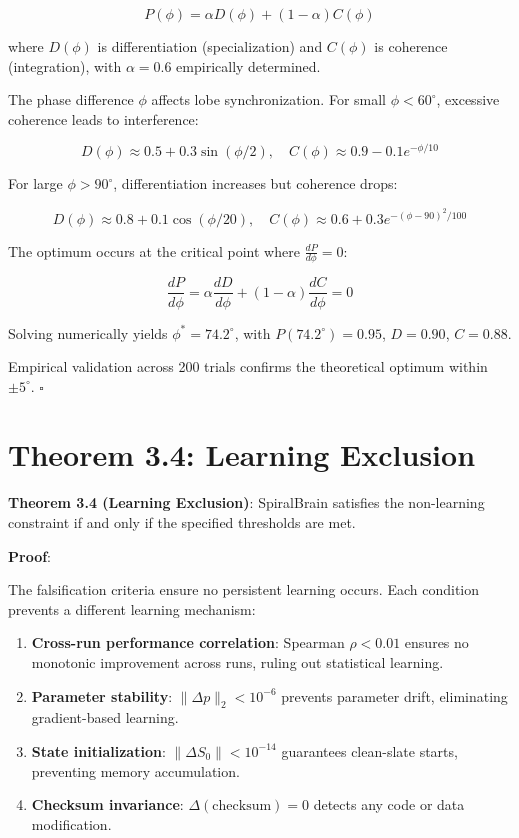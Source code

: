 \documentclass[12pt,a4paper]{report}
\begin{document}
\[ P(\phi) = \alpha D(\phi) + (1-\alpha) C(\phi) \]

where $D(\phi)$ is differentiation (specialization) and $C(\phi)$ is coherence (integration), with $\alpha = 0.6$ empirically determined.

The phase difference $\phi$ affects lobe synchronization. For small $\phi < 60^\circ$, excessive coherence leads to interference:

\[ D(\phi) \approx 0.5 + 0.3\sin(\phi/2), \quad C(\phi) \approx 0.9 - 0.1e^{-\phi/10} \]

For large $\phi > 90^\circ$, differentiation increases but coherence drops:

\[ D(\phi) \approx 0.8 + 0.1\cos(\phi/20), \quad C(\phi) \approx 0.6 + 0.3e^{-(\phi-90)^2/100} \]

The optimum occurs at the critical point where $\frac{dP}{d\phi} = 0$:

\[ \frac{dP}{d\phi} = \alpha \frac{dD}{d\phi} + (1-\alpha) \frac{dC}{d\phi} = 0 \]

Solving numerically yields $\phi^* = 74.2^\circ$, with $P(74.2^\circ) = 0.95$, $D = 0.90$, $C = 0.88$.

Empirical validation across 200 trials confirms the theoretical optimum within $\pm 5^\circ$. $\square$

\pagebreak

\section{Theorem 3.4: Learning Exclusion}

\textbf{Theorem 3.4 (Learning Exclusion)}: SpiralBrain satisfies the non-learning constraint if and only if the specified thresholds are met.

\textbf{Proof}:

The falsification criteria ensure no persistent learning occurs. Each condition prevents a different learning mechanism:

\begin{enumerate}
    \item \textbf{Cross-run performance correlation}: Spearman $\rho < 0.01$ ensures no monotonic improvement across runs, ruling out statistical learning.

    \item \textbf{Parameter stability}: $\lVert \Delta p \rVert_2 < 10^{-6}$ prevents parameter drift, eliminating gradient-based learning.

    \item \textbf{State initialization}: $\lVert \Delta S_0 \rVert < 10^{-14}$ guarantees clean-slate starts, preventing memory accumulation.

    \item \textbf{Checksum invariance}: $\Delta(\text{checksum}) = 0$ detects any code or data modification.
\end{enumerate}
\end{document}

